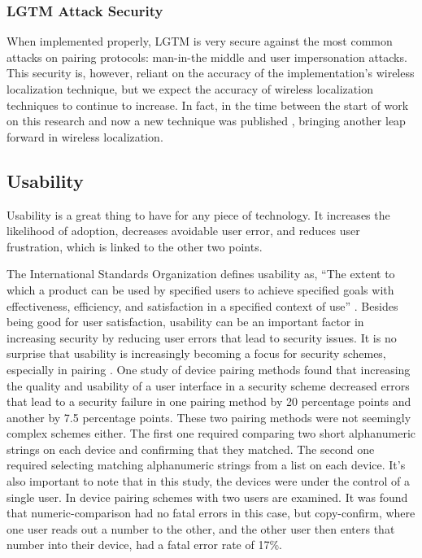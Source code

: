 \documentclass[12pt]{report}
\begin{document}
\subsubsection{LGTM Attack Security}
When implemented properly, LGTM is very secure against the most common attacks on pairing protocols: man-in-the middle and user impersonation attacks. This security is, however, reliant on the accuracy of the implementation's wireless localization technique, but we expect the accuracy of wireless localization techniques to continue to increase. In fact, in the time between the start of work on this research and now a new technique was published \cite{ChronosSingleAPLocalizationVasisht2016}, bringing another leap forward in wireless localization. \par


\subsection{Usability}
Usability is a great thing to have for any piece of technology. It increases the likelihood of adoption, decreases avoidable user error, and reduces user frustration, which is linked to the other two points. \par

The International Standards Organization defines usability as, ``The extent to which a product can be used by specified users to achieve specified goals with effectiveness, efficiency, and satisfaction in a specified context of use'' \cite{UsabilityISO1998}. Besides being good for user satisfaction, usability can be an important factor in increasing security by reducing user errors that lead to security issues. It is no surprise that usability is increasingly becoming a focus for security schemes, especially in pairing \cite{UsabilitySecurityOutOfBandPairingKainda2009,UserPerceptionPairing,PlayfulPairingGallego2011,AliceMeetsBobKumar2009,SecurePairingUsabilityUzun2007,ConferenceCompStudySecurePairingKumar2009}. One study of device pairing methods \cite{SecurePairingUsabilityUzun2007} found that increasing the quality and usability of a user interface in a security scheme decreased errors that lead to a security failure in one pairing method by 20 percentage points and another by 7.5 percentage points. These two pairing methods were not seemingly complex schemes either. The first one required comparing two short alphanumeric strings on each device and confirming that they matched. The second one required selecting matching alphanumeric strings from a list on each device. It's also important to note that in this study, the devices were under the control of a single user. In \cite{AliceMeetsBobKumar2009} device pairing schemes with two users are examined. It was found that numeric-comparison had no fatal errors in this case, but copy-confirm, where one user reads out a number to the other, and the other user then enters that number into their device, had a fatal error rate of 17\%. \par
\end{document}
